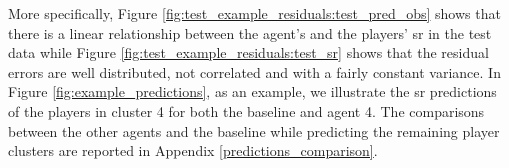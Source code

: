 \noindent
More specifically, Figure \ref{fig:test_example_residuals:test_pred_obs} shows that there is a linear relationship between the agent's and the players' \acs{sr} in the test data while Figure \ref{fig:test_example_residuals:test_sr} shows that the residual errors are well distributed, not correlated and with a fairly constant variance.
In Figure \ref{fig:example_predictions}, as an example, we illustrate the \acs{sr} predictions of the players in cluster 4 for both the baseline and agent 4. The comparisons between the other agents and the baseline while predicting the remaining player clusters are reported in Appendix \ref{predictions_comparison}.
\begin{figure}[h]
  \centering
    

\end{figure}
